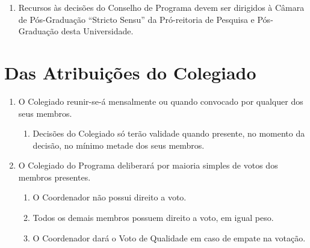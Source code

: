 \documentclass{article}
\newcommand{\singleitem}{\item[Parágrafo Único.]}
\newcommand{\grupoMenor}{Colegiado\xspace}
\newcommand{\grupoMaior}{Conselho\xspace}
\begin{document}
\begin{enumerate}
	\begin{enumerate}
		\singleitem Recursos às decisões do \grupoMaior de Programa devem ser dirigidos à Câmara de Pós-Graduação ``Stricto Sensu'' da Pró-reitoria de Pesquisa e Pós-Graduação desta Universidade.
	\end{enumerate}
\end{enumerate}

\section{Das Atribuições do \grupoMenor}
\begin{enumerate}

	\item O \grupoMenor reunir-se-á mensalmente ou quando convocado por qualquer dos seus membros.
	\begin{enumerate}
		\singleitem Decisões do \grupoMenor só terão validade quando presente, no momento da decisão, no mínimo metade dos seus membros.
	\end{enumerate}

	\item O \grupoMenor do Programa deliberará por maioria simples de votos dos membros presentes.
	\begin{enumerate}
		\item O Coordenador não possui direito a voto.
		\item Todos os demais membros possuem direito a voto, em igual peso.
		\item O Coordenador dará o Voto de Qualidade em caso de empate na votação. 
	\end{enumerate}


\end{enumerate}
\end{document}
